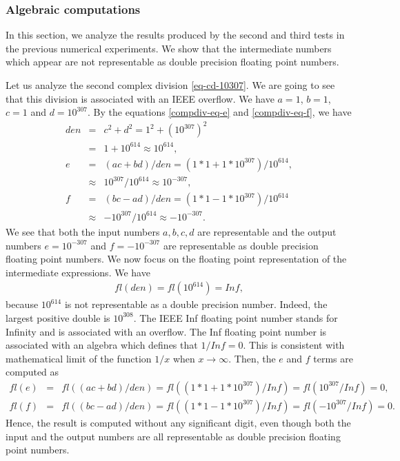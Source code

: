 \subsubsection{Algebraic computations}

In this section, we analyze the results produced by the second and third tests in the 
previous numerical experiments. We show that the intermediate numbers which appear
are not representable as double precision floating point numbers.

Let us analyze the second complex division \ref{eq-cd-10307}.
We are going to see that this division is associated with 
an IEEE overflow.
We have $a=1$, $b=1$, $c=1$ and $d=10^{307}$.
By the equations \ref{compdiv-eq-e} and \ref{compdiv-eq-f}, we have 
\begin{eqnarray}
den &=& c^2 + d^2 = 1^2 + (10^{307})^2 \\
  &=& 1 + 10^{614} \approx 10^{614}, \\
e &=& (ac + bd)/ den = (1*1 + 1*10^{307})/10^{614}, \\
  &\approx& 10^{307}/10^{614}  \approx 10^{-307},\\
f &=& (bc - ad)/ den = (1*1 - 1*10^{307})/10^{614} \\
  &\approx& -10^{307}/10^{614} \approx -10^{-307}.
\end{eqnarray}
We see that both the input numbers $a,b,c,d$ are representable 
and the output numbers $e=10^{-307}$ and $f=-10^{-307}$ are representable as double precision
floating point numbers.
We now focus on the floating point representation of the intermediate expressions.
We have 
\begin{eqnarray}
fl(den) = fl(10^{614}) = Inf,
\end{eqnarray}
because $10^{614}$ is not representable as a double precision number. 
Indeed, the largest positive double is $10^{308}$.
The IEEE Inf floating point number stands for Infinity and is associated with an overflow. 
The Inf floating point number is associated with an algebra which defines that $1/Inf = 0$. 
This is consistent with mathematical limit of the function $1/x$ when $x\rightarrow \infty$.
Then, the $e$ and $f$ terms are computed as 
\begin{eqnarray}
fl(e) &=& fl((ac + bd)/ den) = fl((1*1 + 1*10^{307})/Inf) = fl(10^{307}/Inf) = 0,\\
fl(f) &=& fl((bc - ad)/ den) = fl((1*1 - 1*10^{307})/Inf) = fl(-10^{307}/Inf) = 0.
\end{eqnarray}
Hence, the result is computed without any significant digit,
even though both the input and the output numbers are all representable as double precision
floating point numbers.

